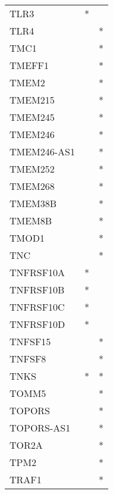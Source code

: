 \begin{longtable}{lcc}
TLR3                  &              * &            \\
TLR4                  &                &          * \\
TMC1                  &                &          * \\
TMEFF1                &                &          * \\
TMEM2                 &                &          * \\
TMEM215               &                &          * \\
TMEM245               &                &          * \\
TMEM246               &                &          * \\
TMEM246-AS1           &                &          * \\
TMEM252               &                &          * \\
TMEM268               &                &          * \\
TMEM38B               &                &          * \\
TMEM8B                &                &          * \\
TMOD1                 &                &          * \\
TNC                   &                &          * \\
TNFRSF10A             &              * &            \\
TNFRSF10B             &              * &            \\
TNFRSF10C             &              * &            \\
TNFRSF10D             &              * &            \\
TNFSF15               &                &          * \\
TNFSF8                &                &          * \\
TNKS                  &              * &          * \\
TOMM5                 &                &          * \\
TOPORS                &                &          * \\
TOPORS-AS1            &                &          * \\
TOR2A                 &                &          * \\
TPM2                  &                &          * \\
TRAF1                 &                &          * \\

\end{longtable}
